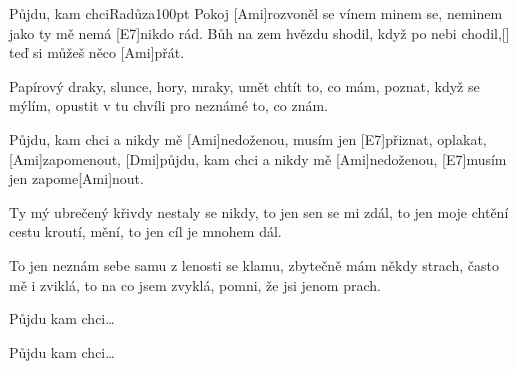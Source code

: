 \begin{song}{Půjdu, kam chci}{Radůza}{100pt}
%
Pokoj [Ami]rozvoněl se vínem minem se, 
neminem jako ty mě nemá [E7]nikdo rád. 
Bůh na zem hvězdu shodil, když po nebi chodil,[]{}
teď si můžeš něco [Ami]přát. 

Papírový draky, slunce, hory, mraky,
umět chtít to, co mám,
poznat, když se mýlím, opustit v tu chvíli
pro neznámé to, co znám.

\chorus%
[Dmi]Půjdu, kam chci a nikdy mě [Ami]nedoženou,
musím jen [E7]přiznat, oplakat, [Ami]zapomenout,
[Dmi]půjdu, kam chci a nikdy mě [Ami]nedoženou,
[E7]musím jen zapome[Ami]nout.

%
Ty mý ubrečený křivdy nestaly se nikdy,
to jen sen se mi zdál,
to jen moje chtění cestu kroutí, mění,
to jen cíl je mnohem dál.

To jen neznám sebe samu z lenosti se klamu,
zbytečně mám někdy strach,
často mě i zviklá, to na co jsem zvyklá,
pomni, že jsi jenom prach.

\chorus Půjdu kam chci\dots


\chorus \rl Půjdu kam chci\dots{}
\end{song}
